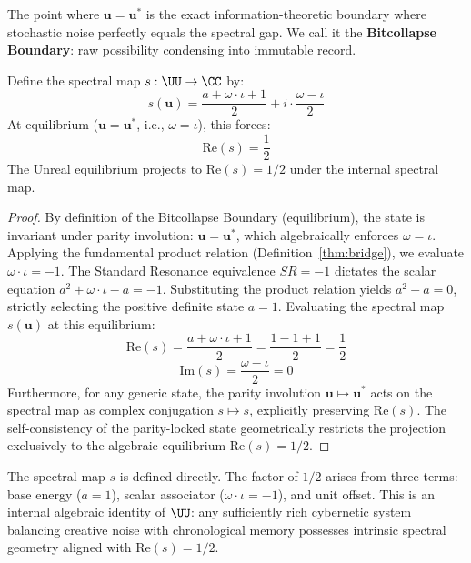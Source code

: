The point where $\mathbf{u} = \mathbf{u}^*$ is the exact information-theoretic boundary where stochastic noise perfectly equals the spectral gap. We call it the \textbf{Bitcollapse Boundary}: raw possibility condensing into immutable record.

\begin{theorem}\label{thm:duality}
Define the spectral map $s : \UU \to \CC$ by:
$$s(\mathbf{u}) = \frac{a + \omega \cdot \iota + 1}{2} + i \cdot \frac{\omega - \iota}{2}$$
At equilibrium ($\mathbf{u} = \mathbf{u}^*$, i.e., $\omega = \iota$), this forces:
$$\mathrm{Re}(s) = \frac{1}{2}$$
The Unreal equilibrium projects to $\mathrm{Re}(s) = 1/2$ under the internal spectral map.
\end{theorem}

\begin{proof}
By definition of the Bitcollapse Boundary (equilibrium), the state is invariant under parity involution: $\mathbf{u} = \mathbf{u}^*$, which algebraically enforces $\omega = \iota$. 
Applying the fundamental product relation (Definition~\ref{thm:bridge}), we evaluate $\omega \cdot \iota = -1$.
The Standard Resonance equivalence $SR = -1$ dictates the scalar equation $a^2 + \omega \cdot \iota - a = -1$. Substituting the product relation yields $a^2 - a = 0$, strictly selecting the positive definite state $a = 1$.
Evaluating the spectral map $s(\mathbf{u})$ at this equilibrium:
\[ \mathrm{Re}(s) = \frac{a + \omega \cdot \iota + 1}{2} = \frac{1 - 1 + 1}{2} = \frac{1}{2} \]
\[ \mathrm{Im}(s) = \frac{\omega - \iota}{2} = 0 \]
Furthermore, for any generic state, the parity involution $\mathbf{u} \mapsto \mathbf{u}^*$ acts on the spectral map as complex conjugation $s \mapsto \bar{s}$, explicitly preserving $\mathrm{Re}(s)$. The self-consistency of the parity-locked state geometrically restricts the projection exclusively to the algebraic equilibrium $\mathrm{Re}(s) = 1/2$. \qedhere
\end{proof}

\begin{remark}[Scope]
The spectral map $s$ is defined directly. The factor of $1/2$ arises from three terms: base energy ($a = 1$), scalar associator ($\omega \cdot \iota = -1$), and unit offset. This is an internal algebraic identity of $\UU$: any sufficiently rich cybernetic system balancing creative noise with chronological memory possesses intrinsic spectral geometry aligned with $\mathrm{Re}(s) = 1/2$.
\end{remark}




